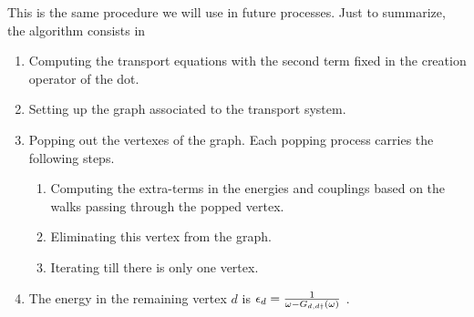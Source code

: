 This is the same procedure we will use in future processes. Just to summarize, the algorithm consists in 
\begin{enumerate}
    \item Computing the transport equations with the second term fixed in the creation operator of the dot.
     \item  Setting up the  graph associated to the transport system.
    \item Popping out the vertexes of the graph. Each popping process carries the following steps.
    \begin{enumerate}
        \item Computing the extra-terms in the energies and couplings based on the walks passing through the popped vertex.
        \item Eliminating this vertex from the graph. 
        \item Iterating till there is only one  vertex.
        \end{enumerate}
    \item The energy in the remaining vertex $d$ is $\epsilon_d = \frac{1}{\omega -G_{d,d\dagger}(\omega)}$ .
\end{enumerate}











